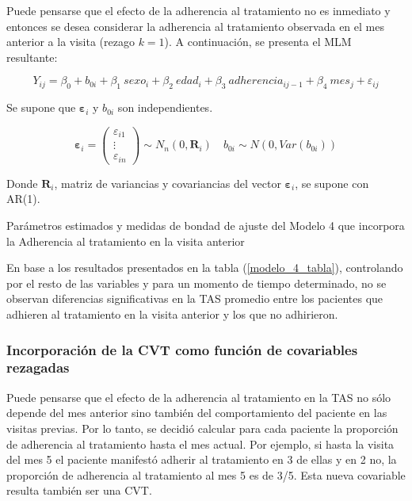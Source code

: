 \documentclass[spanish]{article}
\numberwithin{figure}{subsection}
\numberwithin{equation}{subsection}
\numberwithin{table}{subsection}
\begin{document}
Puede pensarse que el efecto de la adherencia al tratamiento no es inmediato y
entonces se desea considerar la adherencia al tratamiento observada en el mes
anterior a la visita (rezago $k=1$). A continuación, se presenta el MLM
resultante:

\begin{equation}
	\label{modelo_4}
	Y_{ij} = \beta_0 + b_{0i} + \beta_1\ sexo_i + \beta_2\ edad_i + \beta_3\ adherencia_{ij-1}
	+ \beta_4\ mes_j + \varepsilon_{ij}
\end{equation}

Se supone que $\bm{\varepsilon}_i$ y $b_{0i}$ son independientes.

\[ 
	\bm{\varepsilon}_i = \begin{pmatrix} \varepsilon_{i1} \\ \vdots \\ \varepsilon_{in} \end{pmatrix} \sim N_{n}(0, \bm{R}_i)
	\quad
	b_{0i} \sim N(0, Var(b_{0i}))
\]

Donde $\bm{R}_i$, matriz de variancias y covariancias del vector
$\bm{\varepsilon}_{i}$, se supone con AR(1).

\begin{table}[H]
	\centering
	\caption{Parámetros estimados y medidas de bondad de ajuste del Modelo 4 que incorpora la Adherencia al tratamiento en la visita anterior}
	\label{modelo_4_tabla}
	
\end{table}

En base a los resultados presentados en la tabla (\ref{modelo_4_tabla}),
controlando por el resto de las variables y para un momento de tiempo
determinado, no se observan diferencias significativas en la TAS promedio entre
los pacientes que adhieren al tratamiento en la visita anterior y los que no
adhirieron.

\subsubsection{Incorporación de la CVT como función de covariables rezagadas}

Puede pensarse que el efecto de la adherencia al tratamiento en la TAS no sólo
depende del mes anterior sino también del comportamiento del paciente en las
visitas previas. Por lo tanto, se decidió calcular para cada paciente la
proporción de adherencia al tratamiento hasta el mes actual. Por ejemplo, si
hasta la visita del mes 5 el paciente manifestó adherir al tratamiento en 3 de
ellas y en 2 no, la proporción de adherencia al tratamiento al mes 5 es de 3/5.
Esta nueva covariable resulta también ser una CVT.
\end{document}
